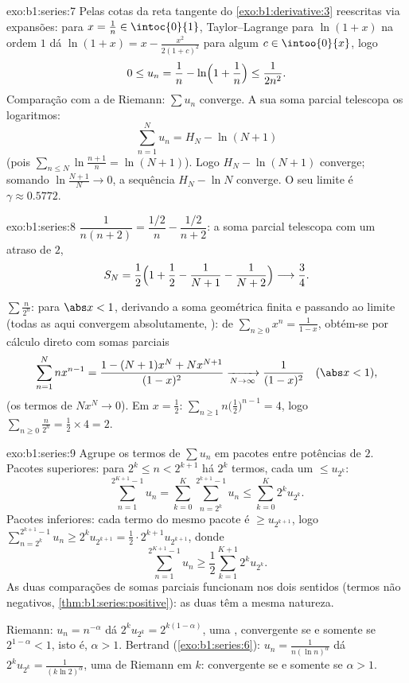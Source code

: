 \begin{solution}{exo:b1:series:7}
Pelas cotas da reta tangente do \cref{exo:b1:derivative:3} reescritas
via expansões: para $x = \frac1n \in \intoc{0}{1}$, Taylor--Lagrange
para $\ln(1+x)$ na ordem $1$ dá $\ln(1 + x) = x - \frac{x^2}{2(1 +
c)^2}$ para algum $c \in \intoo{0}{x}$, logo
\[
0 \leq u_n = \frac1n - \ln\Bigl(1 + \frac1n\Bigr) \leq
\frac{1}{2n^2} .
\]
Comparação com a  de Riemann: $\sum u_n$ converge. A sua soma
parcial telescopa os logaritmos:
\[
\sum_{n=1}^{N} u_n = H_N - \ln(N+1)
\]
(pois $\sum_{n\leq N} \ln\frac{n+1}{n} = \ln(N+1)$). Logo $H_N -
\ln(N+1)$ converge; somando $\ln\frac{N+1}{N} \to 0$, a sequência
$H_N - \ln N$ converge. O seu limite é $\gamma \approx 0.5772$.
\end{solution}

\begin{solution}{exo:b1:series:8}
$\dfrac{1}{n(n+2)} = \dfrac{1/2}{n} - \dfrac{1/2}{n+2}$: a soma
parcial telescopa com um atraso de $2$,
\[
S_N = \frac12\Bigl(1 + \frac12 - \frac{1}{N+1} -
\frac{1}{N+2}\Bigr) \longrightarrow \frac34 .
\]

$\sum \frac{n}{2^n}$: para $\abs x < 1$, derivando a soma geométrica finita e
passando ao limite (todas as  aqui convergem absolutamente,
): de $\sum_{n\geq0} x^n = \frac{1}{1-x}$,
obtém-se por cálculo direto com somas parciais
\[
\sum_{n=1}^{N} n x^{n-1}
= \frac{1 - (N+1)x^N + N x^{N+1}}{(1 - x)^2}
\xrightarrow[N\to\infty]{} \frac{1}{(1-x)^2}
\quad (\abs x < 1),
\]
(os termos de  $N x^N \to 0$). Em $x = \frac12$:
$\sum_{n\geq1} n\bigl(\frac12\bigr)^{n-1} = 4$, logo $\sum_{n\geq0}
\frac{n}{2^n} = \frac12 \times 4 = 2$.
\end{solution}

\begin{solution}{exo:b1:series:9}
Agrupe os termos de $\sum u_n$ em pacotes entre potências de $2$.
Pacotes superiores: para $2^k \leq n < 2^{k+1}$ há $2^k$ termos,
cada um $\leq u_{2^k}$:
\[
\sum_{n=1}^{2^{K+1}-1} u_n
= \sum_{k=0}^{K} \sum_{n=2^k}^{2^{k+1}-1} u_n
\leq \sum_{k=0}^{K} 2^k u_{2^k} .
\]
Pacotes inferiores: cada termo do mesmo pacote é $\geq u_{2^{k+1}}$,
logo $\sum_{n=2^k}^{2^{k+1}-1} u_n \geq 2^k u_{2^{k+1}} = \frac12
\cdot 2^{k+1} u_{2^{k+1}}$, donde
\[
\sum_{n=1}^{2^{K+1}-1} u_n \geq \frac12 \sum_{k=1}^{K+1} 2^{k}
u_{2^{k}} .
\]
As duas comparações de somas parciais funcionam nos dois sentidos
(termos não negativos, \cref{thm:b1:series:positive}): as duas  têm a mesma natureza.

Riemann: $u_n = n^{-\alpha}$ dá $2^k u_{2^k} =
2^{k(1-\alpha)}$, uma , convergente se e
somente se $2^{1 - \alpha}
< 1$, isto é, $\alpha > 1$. Bertrand
(\cref{exo:b1:series:6}): $u_n = \frac{1}{n(\ln n)^\alpha}$ dá
$2^k u_{2^k} = \frac{1}{(k\ln 2)^\alpha}$, uma  de Riemann em $k$:
convergente se e somente se $\alpha > 1$.
\end{solution}

